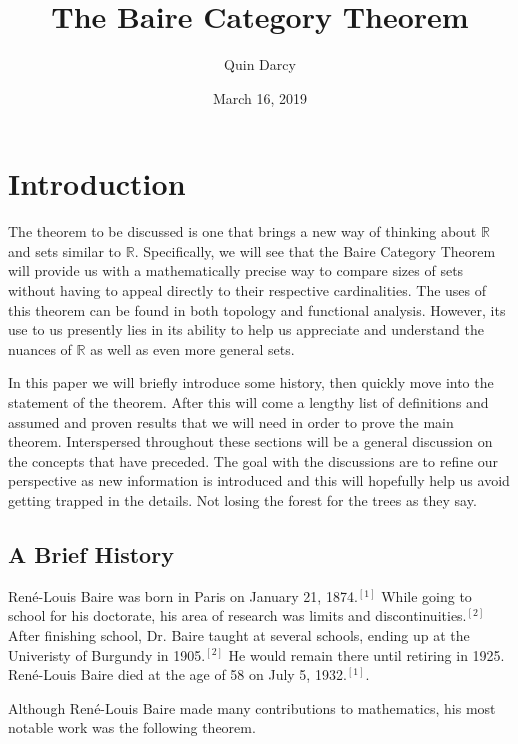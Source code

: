 \documentclass{article}
\theoremstyle{definition}
\theoremstyle{remark}
\theoremstyle{definition}
\begin{document}
\title{The Baire Category Theorem}
\author{Quin Darcy}
\date{March 16, 2019}
\maketitle

\section{Introduction}

The theorem to be discussed is one that brings a new way of thinking about $\mathbb{R}$ and sets similar to $\mathbb{R}$. Specifically, we will see that the Baire Category Theorem will provide us with a mathematically precise way to compare sizes of sets without having to appeal directly to their respective cardinalities. The uses of this theorem can be found in both topology and functional analysis. However, its use to us presently lies in its ability to help us appreciate and understand the nuances of $\mathbb{R}$ as well as even more general sets. \par In this paper we will briefly introduce some history, then quickly move into the statement of the theorem. After this will come a lengthy list of definitions and assumed and proven results that we will need in order to prove the main theorem. Interspersed throughout these sections will be a general discussion on the concepts that have preceded. The goal with the discussions are to refine our perspective as new information is introduced and this will hopefully help us avoid getting trapped in the details. Not losing the forest for the trees as they say.  

\subsection{A Brief History}

Ren\'{e}-Louis Baire was born in Paris on January 21, 1874.$^{[1]}$ While going to school for his doctorate, his area of research was limits and discontinuities.$^{[2]}$ After finishing school, Dr. Baire taught at several schools, ending up at the Univeristy of Burgundy in 1905.$^{[2]}$ He would remain there until retiring in 1925. Ren\'{e}-Louis Baire died at the age of 58 on July 5, 1932.$^{[1]}$.\par
Although Ren\'{e}-Louis Baire made many contributions to mathematics, his most notable work was the following theorem.
\end{document}
